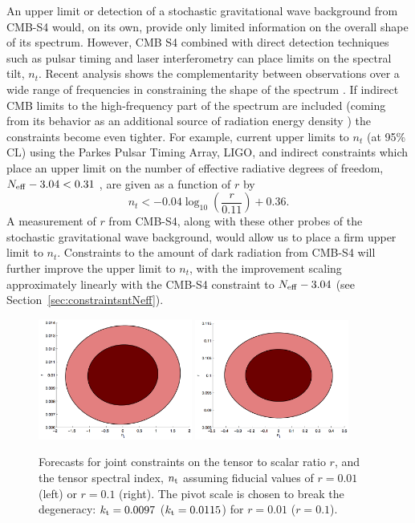 An upper limit or detection of a stochastic gravitational wave background from CMB-S4 would, on its own, provide only limited information on the overall shape of its spectrum. However, CMB S4 combined with direct detection techniques such as pulsar timing and laser interferometry can place limits on the spectral tilt, $n_t$. Recent analysis shows the complementarity between observations over a wide range of frequencies in constraining the shape of the spectrum \cite{Lasky:2015lej,Meerburg:2015zua}. If indirect CMB limits to the high-frequency part of the spectrum are included (coming from its behavior as an additional source of radiation energy density \cite{Smith:2006nka}) the constraints become even tighter. For example, current upper limits to $n_t$ (at 95\% CL) using the Parkes Pulsar Timing Array, LIGO, and indirect constraints which place an upper limit on the number of effective radiative degrees of freedom, $N_{\rm eff}-3.04 < 0.31$ \cite{Pagano:2015hma}, are given as a function of $r$ by \cite{Lasky:2015lej}
\begin{equation}
n_t < -0.04 \log_{10} \left(\frac{r}{0.11}\right) + 0.36.
\end{equation}
A measurement of $r$ from CMB-S4, along with these other probes of the stochastic gravitational wave background, would allow us to place a firm upper limit to $n_t$.  Constraints to the amount of dark radiation from CMB-S4 will further improve the upper limit to $n_t$, with the improvement scaling approximately linearly with the CMB-S4 constraint to $N_{\rm eff}-3.04$ \cite{Meerburg:2015zua} (see Section~\ref{sec:constraintsntNeff}).

\begin{figure}[htbp!]
\centering
\includegraphics[width=0.45\textwidth]{Inflation/r_nt_r01_kt0097.png}
\includegraphics[width=0.45\textwidth]{Inflation/r_nt_r1_kt0115.png}
\caption{ Forecasts for joint constraints on the tensor to scalar ratio $r$, and the tensor spectral index, $n_{\rm t}$ assuming fiducial values of $r=0.01$ (left) or $r=0.1$ (right). The pivot scale is chosen to break the degeneracy: $k_{\rm t}=0.0097$ ($k_{\rm t}=0.0115$) for $r=0.01$ ($r=0.1$).}
\label{fig:rnT}
\end{figure}

